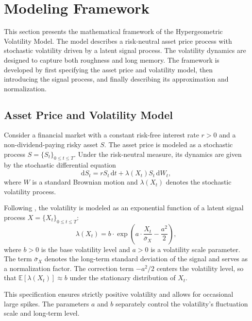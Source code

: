\section{Modeling Framework} \label{sec:ModelingFramework}

This section presents the mathematical framework of the Hypergeometric Volatility Model. The model describes a risk-neutral asset price process with stochastic volatility driven by a latent signal process. The volatility dynamics are designed to capture both roughness and long memory. The framework is developed by first specifying the asset price and volatility model, then introducing the signal process, and finally describing its approximation and normalization.


\subsection{Asset Price and Volatility Model} \label{subsec:AssetPriceVolatilityModel}

Consider a financial market with a constant risk-free interest rate $r > 0$ and a non-dividend-paying risky asset $S$. The asset price is modeled as a stochastic process $S = \{S_t\}_{0 \leq t \leq T}$. Under the risk-neutral measure, its dynamics are given by the stochastic differential equation
\begin{equation} \label{eq:AssetSDE}
    \mathrm{d} S_t = r S_t \,\mathrm{d}t + \lambda(X_t) S_t \,\mathrm{d}W_t,
\end{equation}
where $W$ is a standard Brownian motion and $\lambda(X_t)$ denotes the stochastic volatility process.

Following \citet{BennedsenLundePakkanen2021}, the volatility is modeled as an exponential function of a latent signal process $X = \{X_t\}_{0 \leq t \leq T}$:
\begin{equation} \label{eq:Volatility}
    \lambda(X_t) = b \cdot \exp \left( a \cdot \frac{X_t}{\bar{\sigma}_X} - \frac{a^2}{2} \right),
\end{equation}
where $b > 0$ is the base volatility level and $a > 0$ is a volatility scale parameter. The term $\bar{\sigma}_X$ denotes the long-term standard deviation of the signal and serves as a normalization factor. The correction term $-a^2/2$ centers the volatility level, so that $\mathbb{E}[\lambda(X_t)] \approx b$ under the stationary distribution of $X_t$.

This specification ensures strictly positive volatility and allows for occasional large spikes. The parameters $a$ and $b$ separately control the volatility's fluctuation scale and long-term level.


